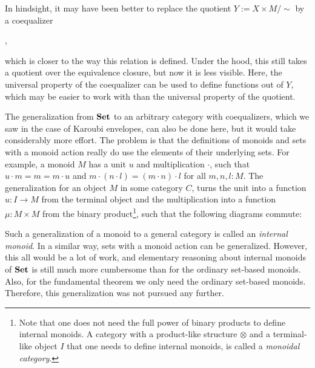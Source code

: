 In hindsight, it may have been better to replace the quotient $ Y := X \times M / \sim $ by a coequalizer
\begin{center}
  ,
\end{center}
which is closer to the way this relation is defined. Under the hood, this still takes a quotient over the equivalence closure, but now it is less visible. Here, the universal property of the coequalizer can be used to define functions out of $ Y $, which may be easier to work with than the universal property of the quotient.

The generalization from $ \mathbf{Set} $ to an arbitrary category with coequalizers, which we saw in the case of Karoubi envelopes, can also be done here, but it would take considerably more effort. The problem is that the definitions of monoids and sets with a monoid action really do use the elements of their underlying sets. For example, a monoid $ M $ has a unit $ u $ and multiplication $ \cdot $, such that $ u \cdot m = m = m \cdot u $ and $ m \cdot (n \cdot l) = (m \cdot n) \cdot l $ for all $ m, n, l : M $. The generalization for an object $ M $ in some category $ C $, turns the unit into a function $ u : I \to M $ from the terminal object and the multiplication into a function $ \mu : M \times M $ from the binary product\footnote{Note that one does not need the full power of binary products to define internal monoids. A category with a product-like structure $ \otimes $ and a terminal-like object $ I $ that one needs to define internal monoids, is called a \textit{monoidal category}.}, such that the following diagrams commute:
\begin{center}
\end{center}
Such a generalization of a monoid to a general category is called an \textit{internal monoid}. In a similar way, sets with a monoid action can be generalized. However, this all would be a lot of work, and elementary reasoning about internal monoids of $ \mathbf{Set} $ is still much more cumbersome than for the ordinary set-based monoids. Also, for the fundamental theorem we only need the ordinary set-based monoids. Therefore, this generalization was not pursued any further.

